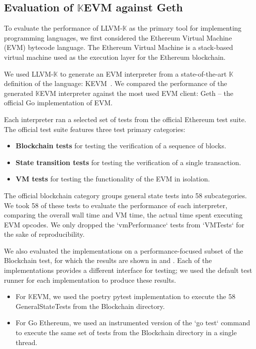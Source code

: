 \documentclass{article}
\theoremstyle{definition}
\newcommand{\K}{$\mathbb{K}$\xspace}
\newcommand{\KL}{LLVM-\K}
\newcommand{\code}[1]{{\small \ttfamily #1}}
\begin{document}
\subsection{Evaluation of {\K}EVM against Geth}

To evaluate the performance of \KL as the primary tool for implementing programming languages, we first considered the Ethereum Virtual Machine (EVM) bytecode language. The Ethereum Virtual Machine is a stack-based virtual machine used as the execution layer for the Ethereum blockchain.

We used \KL to generate an EVM interpreter from a state-of-the-art \K definition of the language: KEVM~\cite{HSZ+18}. We compared the performance of the generated {\K}EVM interpreter against the most used EVM client: Geth -- the official Go implementation of EVM.

Each interpreter ran a selected set of tests from the official Ethereum test suite. The official test suite features three test primary categories:
\begin{itemize}
    \item \textbf{Blockchain tests} for testing the verification of a sequence of blocks.
    \item \textbf{State transition tests} for testing the verification of a single transaction.
    \item \textbf{VM tests} for testing the functionality of the EVM in isolation.
\end{itemize}

The official blockchain category groups general state tests into 58 subcategories.
We took 58 of these tests to evaluate the performance of each interpreter, comparing the overall wall time and VM time, the actual time spent executing EVM opcodes. We only dropped the `vmPerformance` tests from `VMTests` for the sake of reproducibility.


We also evaluated the implementations on a performance-focused subset of the
Blockchain test, for which the results are shown in  and . Each
of the implementations provides a different interface for testing; we
used the default test runner for each implementation to produce these results.
 \begin{itemize}
     \item For {\K}EVM, we used the \code{poetry pytest} implementation to execute the 58 \code{GeneralStateTests} from the Blockchain directory.

     \item For Go Ethereum, we used an instrumented version of the `go test` command to execute the same set of tests from the Blockchain directory in a single thread.
\end{itemize}
\end{document}
